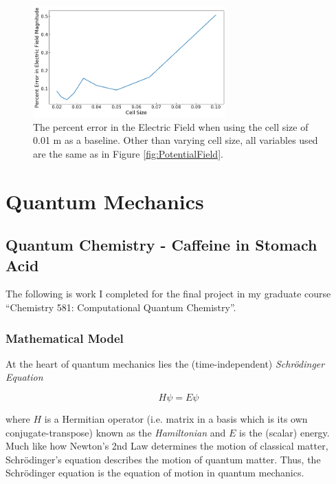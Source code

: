 \documentclass{report}
\begin{document}
            \begin{figure}[h]
                \centering
                \includegraphics[width=0.66\textwidth]{images/PercentErrorCell.png}
                \caption{The percent error in the Electric Field when using the cell size of 0.01 m as a baseline. Other than varying cell size, all variables used are the same as in Figure \ref{fig:PotentialField}.}
                \label{fig:cellsize}
            \end{figure}

\pagebreak

\chapter{Quantum Mechanics} \label{sec:quantum}

    \section{Quantum Chemistry - Caffeine in Stomach Acid}

        The following is work I completed for the final project in my graduate course ``Chemistry 581: Computational Quantum Chemistry''\cite{Chapman2023}.

        \subsection{Mathematical Model}

            At the heart of quantum mechanics lies the (time-independent) \emph{Schr{\"o}dinger Equation}

            \begin{equation}
                H \psi = E \psi
            \end{equation}

            where $H$ is a Hermitian operator (i.e. matrix in a basis which is its own conjugate-transpose) known as the \emph{Hamiltonian} and $E$ is the (scalar) energy.  Much like how Newton's 2nd Law determines the motion of classical matter, Schr{\"o}dinger's equation describes the motion of quantum matter.  Thus, the Schr{\"o}dinger equation is the equation of motion in quantum mechanics.
            
\end{document}
